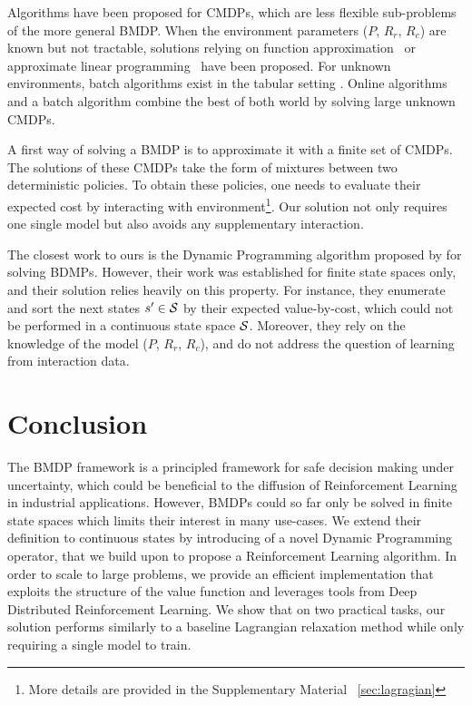 \documentclass{article}
\begin{document}
Algorithms have been proposed for CMDPs, which are less flexible sub-problems of the more general BMDP. When the environment parameters ($P$, $R_r$, $R_c$) are known but not tractable, solutions relying on function approximation~\citep{Undurti} or approximate linear programming~\citep{Poupart2015} have been proposed. For unknown environments, batch algorithms exist in the tabular setting \citep{Thomas2015, Petrik2016, Laroche2019}. Online algorithms \citep{Geibel2005, Abe2010,ChowGJP15,AchiamHTA17} and a batch algorithm \citep{le2019batch} combine the best of both world by solving large unknown CMDPs.

A first way of solving a BMDP is to approximate it with a finite set of CMDPs. The solutions of these CMDPs take the form of mixtures between two deterministic policies\citep[Theorem 4.4,][]{BEUTLER1985236}. To obtain these policies, one needs to evaluate their expected cost by interacting with environment\footnote{More details are provided in the Supplementary Material ~\ref{sec:lagragian}}. Our solution not only requires one single model but also avoids any supplementary interaction.

The closest work to ours is the Dynamic Programming algorithm proposed by \citet{Boutilier_Lu:uai16} for solving BDMPs. However, their work was established for finite state spaces only, and their solution relies heavily on this property. For instance, they enumerate and sort the next states $s'\in\mathcal{S}$ by their expected value-by-cost, which could not be performed in a continuous state space $\mathcal{S}$. Moreover, they rely on the knowledge of the model ($P$, $R_r$, $R_c$), and do not address the question of learning from interaction data.

\section{Conclusion}
The BMDP framework is a principled framework for safe decision making under uncertainty, which could be beneficial to the diffusion of Reinforcement Learning in industrial applications. However, BMDPs could so far only be solved in finite state spaces which limits their interest in many use-cases. We extend their definition to continuous states by introducing of a novel Dynamic Programming operator, that we build upon to propose a Reinforcement Learning algorithm. In order to scale to large problems, we provide an efficient implementation that exploits the structure of the value function and leverages tools from Deep Distributed Reinforcement Learning. We show that on two practical tasks, our solution performs similarly to a baseline Lagrangian relaxation method while only requiring a single model to train.
\end{document}
